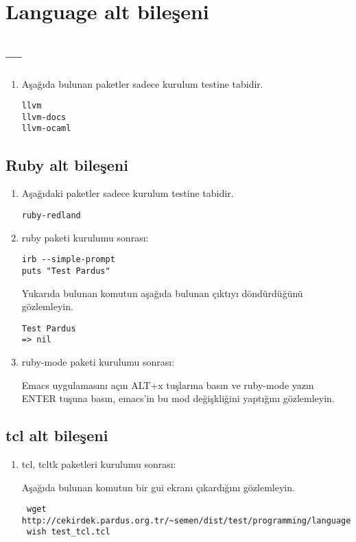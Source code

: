 \documentclass[a4paper,10pt]{article}
\begin{document}
\section{Language alt bileşeni}

\subsection{---}
\begin{enumerate}
\item Aşağıda bulunan paketler sadece kurulum testine tabidir.

\begin{verbatim}
llvm
llvm-docs
llvm-ocaml
\end{verbatim}

\end{enumerate}

\subsection{Ruby alt bileşeni}

\begin{enumerate}
\item Aşağıdaki paketler sadece kurulum testine tabidir.
\begin{verbatim}
ruby-redland
\end{verbatim}


 \item ruby paketi kurulumu sonrası:

\begin{verbatim}
irb --simple-prompt 
puts "Test Pardus"
\end{verbatim}

Yukarıda bulunan komutun aşağıda bulunan çıktıyı döndürdüğünü gözlemleyin.
\begin{verbatim}
Test Pardus
=> nil
\end{verbatim}

\item ruby-mode paketi kurulumu sonrası:

Emacs uygulamasını açın ALT+x tuşlarına basın ve ruby-mode yazın ENTER tuşuna basın, emacs'in bu mod değişkliğini yaptığını gözlemleyin.
\end{enumerate}

\subsection{tcl alt bileşeni}

\begin{enumerate}
 \item tcl, tcltk paketleri kurulumu sonrası:

Aşağıda bulunan komutun bir gui ekranı çıkardığını gözlemleyin.
\begin{verbatim}
 wget http://cekirdek.pardus.org.tr/~semen/dist/test/programming/language/test_tcl.tcl
 wish test_tcl.tcl
\end{verbatim}


\end{enumerate}
\end{document}
